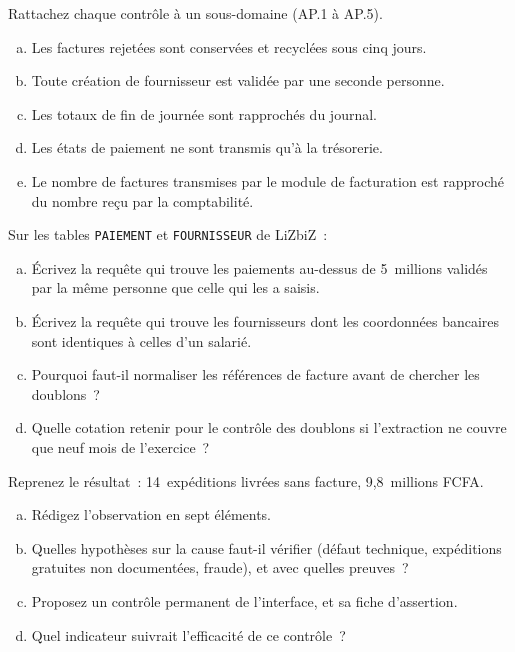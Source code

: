 \bigskip

\begin{boxexo}[title={\ding{45}\quad Exercice~18.1. Rattacher les contrôles \niveaubase}]
Rattachez chaque contrôle à un sous-domaine (AP.1 à AP.5).
\begin{enumerate}[(a)]
    \item Les factures rejetées sont conservées et recyclées sous cinq jours.
    \item Toute création de fournisseur est validée par une seconde personne.
    \item Les totaux de fin de journée sont rapprochés du journal.
    \item Les états de paiement ne sont transmis qu'à la trésorerie.
    \item Le nombre de factures transmises par le module de facturation est
          rapproché du nombre reçu par la comptabilité.
\end{enumerate}
\end{boxexo}

\begin{boxexo}[title={\ding{45}\quad Exercice~18.2. Écrire les requêtes \niveaumoyen}]
Sur les tables \texttt{PAIEMENT} et \texttt{FOURNISSEUR} de LiZbiZ~:
\begin{enumerate}[(a)]
    \item Écrivez la requête qui trouve les paiements au-dessus de
          5~millions validés par la même personne que celle qui les a
          saisis.
    \item Écrivez la requête qui trouve les fournisseurs dont les
          coordonnées bancaires sont identiques à celles d'un salarié.
    \item Pourquoi faut-il normaliser les références de facture avant de
          chercher les doublons~?
    \item Quelle cotation retenir pour le contrôle des doublons si
          l'extraction ne couvre que neuf mois de l'exercice~?
\end{enumerate}
\end{boxexo}

\begin{boxexo}[title={\ding{45}\quad Exercice~18.3. L'interface expéditions-facturation \niveauexpert}]
Reprenez le résultat~: 14~expéditions livrées sans facture, 9,8~millions
FCFA.
\begin{enumerate}[(a)]
    \item Rédigez l'observation en sept éléments.
    \item Quelles hypothèses sur la cause faut-il vérifier (défaut technique,
          expéditions gratuites non documentées, fraude), et avec quelles
          preuves~?
    \item Proposez un contrôle permanent de l'interface, et sa fiche
          d'assertion.
    \item Quel indicateur suivrait l'efficacité de ce contrôle~?
\end{enumerate}
\end{boxexo}


